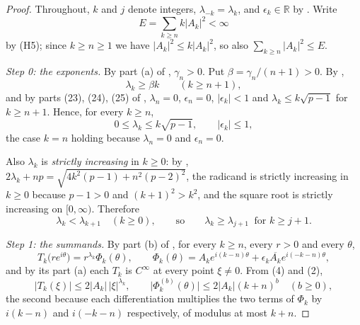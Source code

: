 \begin{proof}
Throughout, $k$ and $j$ denote integers, $\lambda_{-k}=\lambda_k$, and
$\epsilon_k\in\mathbb{R}$ by .  Write
\[
  E=\sum_{k\ge n}k|A_k|^2<\infty
\]
by (H5); since $k\ge n\ge1$ we have $|A_k|^2\le k|A_k|^2$, so also
$\sum_{k\ge n}|A_k|^2\le E$.

\emph{Step 0: the exponents.}  By part (a) of ,
$\gamma_n>0$.  Put $\beta=\gamma_n/(n+1)>0$.  By
,
\begin{equation}\tag{1}
  \lambda_k\ge\beta k\qquad(k\ge n+1),
\end{equation}
and by parts (23), (24), (25) of ,
$\lambda_n=0$, $\epsilon_n=0$, $|\epsilon_k|<1$ and
$\lambda_k\le k\sqrt{p-1}$ for $k\ge n+1$.  Hence, for every $k\ge n$,
\begin{equation}\tag{2}
  0\le\lambda_k\le k\sqrt{p-1},\qquad|\epsilon_k|\le1,
\end{equation}
the case $k=n$ holding because $\lambda_n=0$ and $\epsilon_n=0$.

Also $\lambda_k$ is \emph{strictly increasing} in $k\ge0$: by
,
$2\lambda_k+np=\sqrt{4k^2(p-1)+n^2(p-2)^2}$, the radicand is strictly
increasing in $k\ge0$ because $p-1>0$ and $(k+1)^2>k^2$, and the square root is
strictly increasing on $[0,\infty)$.  Therefore
\begin{equation}\tag{3}
  \lambda_{k}<\lambda_{k+1}\quad(k\ge0),\qquad\text{so}\qquad
  \lambda_k\ge\lambda_{j+1}\ \text{ for }k\ge j+1 .
\end{equation}

\emph{Step 1: the summands.}  By part (b) of , for
every $k\ge n$, every $r>0$ and every $\theta$,
\begin{equation}\tag{4}
  T_k\bigl(re^{i\theta}\bigr)=r^{\lambda_k}\Phi_k(\theta),\qquad
  \Phi_k(\theta)=A_ke^{i(k-n)\theta}+\epsilon_k\overline{A_k}e^{i(-k-n)\theta},
\end{equation}
and by its part (a) each $T_k$ is $C^\infty$ at every point $\xi\neq0$.  From
(4) and (2),
\begin{equation}\tag{5}
  \bigl|T_k(\xi)\bigr|\le2|A_k|\,|\xi|^{\lambda_k},\qquad
  \bigl|\Phi_k^{(b)}(\theta)\bigr|\le2|A_k|(k+n)^{b}\quad(b\ge0),
\end{equation}
the second because each differentiation multiplies the two terms of $\Phi_k$ by
$i(k-n)$ and $i(-k-n)$ respectively, of modulus at most $k+n$.


\end{proof}
